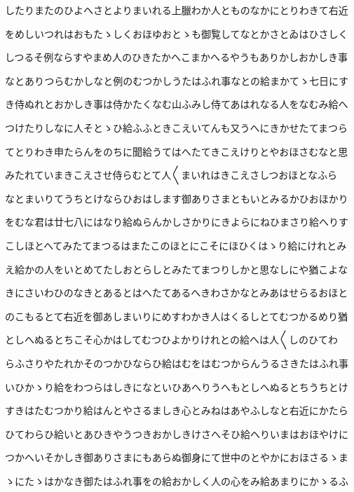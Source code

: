 \documentclass[a4paper,11pt,landscape]{ltjtarticle}
\begin{document}
\par\medskip
したりまたのひよへさとよりまいれる上臘わか人とものなかにとりわきて右近
\par\medskip
をめしいつれはおもたゝしくおほゆおとゝも御覧してなとかさとゐはひさしく
\par\medskip
しつるそ例ならすやまめ人のひきたかへこまかへるやうもありかしおかしき事
\par\medskip
なとありつらむかしなと例のむつかしうたはふれ事なとの給まかてゝ七日にす
\par\medskip
き侍ぬれとおかしき事は侍かたくなむ山ふみし侍てあはれなる人をなむみ給へ
\par\medskip
つけたりしなに人そとゝひ給ふふときこえいてんも又うへにきかせたてまつら
\par\medskip
てとりわき申たらんをのちに聞給うてはへたてきこえけりとやおほさむなと思
\par\medskip
みたれていまきこえさせ侍らむとて人〱まいれはきこえさしつおほとなふら
\par\medskip
なとまいりてうちとけならひおはします御ありさまともいとみるかひおほかり
\par\medskip
をむな君は廿七八にはなり給ぬらんかしさかりにきよらにねひまさり給へりす
\par\medskip
こしほとへてみたてまつるはまたこのほとにこそにほひくはゝり給にけれとみ
\par\medskip
え給かの人をいとめてたしおとらしとみたてまつりしかと思なしにや猶こよな
\par\medskip
きにさいわひのなきとあるとはへたてあるへきわさかなとみあはせらるおほと
\par\medskip
のこもるとて右近を御あしまいりにめすわかき人はくるしとてむつかるめり猶
\par\medskip
としへぬるとちこそ心かはしてむつひよかりけれとの給へは人〱しのひてわ
\par\medskip
らふさりやたれかそのつかひならひ給はむをはむつからんうるさきたはふれ事
\par\medskip
いひかゝり給をわつらはしきになといひあへりうへもとしへぬるとちうちとけ
\par\medskip
すきはたむつかり給はんとやさるましき心とみねはあやふしなと右近にかたら
\par\medskip
ひてわらひ給いとあひきやうつきおかしきけさへそひ給へりいまはおほやけに
\par\medskip
つかへいそかしき御ありさまにもあらぬ御身にて世中のとやかにおほさるゝま
\par\medskip
ゝにたゝはかなき御たはふれ事をの給おかしく人の心をみ給あまりにかゝるふ
\end{document}

